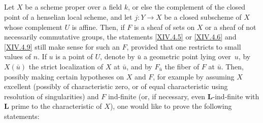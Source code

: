 \documentclass[11pt,a4paper,oneside]{book}
\providecommand{\LL}{\mathbf L}
\theoremstyle{plain}
\theoremstyle{definition}
\theoremstyle{remark}
\renewcommand{\Ref}[1]{\textup{\ref{#1}}}
\begin{document}
\subsection{\texorpdfstring{}{XIV.6.2}} \label{XIV.6.2}
Let $X$ be a scheme proper over a field $k$, or else the complement of the closed point of a henselian local scheme, and let $j:Y \to X$ be a closed subscheme of $X$ whose complement $U$ is affine. Then, if $F$ is a sheaf of sets on $X$ or a sheaf of not necessarily commutative groups, the statements \Ref{XIV.4.5} or \Ref{XIV.4.6} and \Ref{XIV.4.9} still make sense for such an $F$, provided that one restricts to small values of $n$. If $u$ is a point of $U$, denote by $\bar{u}$ a geometric point lying over~$u$, by $X(\bar{u})$ the strict localization of $X$ at $\bar{u}$, and by $F_{\bar{u}}$ the fiber of $F$ at $\bar{u}$. Then, possibly making certain hypotheses on $X$ and $F$, for example by assuming $X$ excellent (possibly of characteristic zero, or of equal characteristic using resolution of singularities) and $F$ ind-finite (or, if necessary, even $\LL$-ind-finite with $\LL$ prime to the characteristic of $X$), one would like to prove the following statements:
\end{document}
